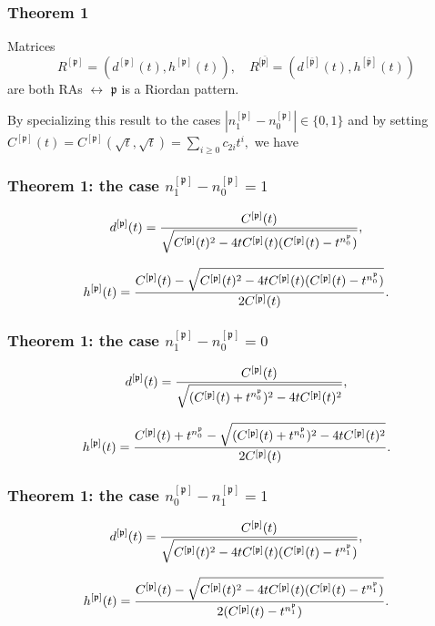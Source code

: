\documentclass{beamer}
\begin{document}
\begin{frame}\frametitle{Theorem 1}
Matrices 
\begin{displaymath}
{{R}^{[\mathfrak{p}]}}=(d^{[\mathfrak{p}]}(t),h^{[\mathfrak{p}]}(t)), \quad
{{R}^{[\bar{\mathfrak{p}]}}}=(d^{[\bar{\mathfrak{p}}]}(t),h^{[\bar{\mathfrak{p}}]}(t))
\end{displaymath}
are both RAs $\leftrightarrow$  $\mathfrak{p}$ is a Riordan pattern.

\begin{block}{}
By specializing this result  to the cases
$\left|n_1^{[\mathfrak{p}]}-n_0^{[\mathfrak{p}]}\right|\in \{0,1\}$ and by
setting
$C^{[\mathfrak{p}]}(t)=C^{[\mathfrak{p}]}\left(\sqrt{t},\sqrt{t}\right)=\sum_{i
\geq 0}c_{2i}t^i,$ we have
\end{block}

\end{frame}

\begin{frame}\frametitle{Theorem 1: the case $n_1^{[\mathfrak{p}]}-n_0^{[\mathfrak{p}]}=1$}
$$d^{[\mathfrak{p}]}(t)={C^{[\mathfrak{p}]}(t)
\over \sqrt{C^{[\mathfrak{p}]}(t)^2-4tC^{[\mathfrak{p}]}(t)(C^{[\mathfrak{p}]}(t)-t^{n_0^{\mathfrak{p}}})}}, $$

$$h^{[\mathfrak{p}]}(t)={C^{[\mathfrak{p}]}(t) -\sqrt{C^{[\mathfrak{p}]}(t)^2-4tC^{[\mathfrak{p}]}(t)(C^{[\mathfrak{p}]}(t)-t^{n_0^{\mathfrak{p}}})}
\over 2 C^{[\mathfrak{p}]}(t)}.$$
\end{frame}

\begin{frame}\frametitle{Theorem 1: the case $n_1^{[\mathfrak{p}]}-n_0^{[\mathfrak{p}]}=0$}
$$d^{[\mathfrak{p}]}(t)={C^{[\mathfrak{p}]}(t)
\over \sqrt{( C^{[\mathfrak{p}]}(t)+t^{n_0^{\mathfrak{p}}})^2-4tC^{[\mathfrak{p}]}(t)^2}}, $$

$$h^{[\mathfrak{p}]}(t)=
{C^{[\mathfrak{p}]}(t)+ t^{n_0^{\mathfrak{p}}} - \sqrt{( C^{[\mathfrak{p}]}(t)+t^{n_0^{\mathfrak{p}}})^2-4tC^{[\mathfrak{p}]}(t)^2} \over 2
C^{[\mathfrak{p}]}(t)}.$$
\end{frame}

\begin{frame}\frametitle{Theorem 1: the case $n_0^{[\mathfrak{p}]}-n_1^{[\mathfrak{p}]}=1$}
$$d^{[\mathfrak{p}]}(t)={C^{[\mathfrak{p}]}(t)
\over \sqrt{C^{[\mathfrak{p}]}(t)^2-4tC^{[\mathfrak{p}]}(t)(C^{[\mathfrak{p}]}(t)-t^{n_1^{\mathfrak{p}}})}}, $$

$$h^{[\mathfrak{p}]}(t)={C^{[\mathfrak{p}]}(t) -\sqrt{C^{[\mathfrak{p}]}(t)^2-4tC^{[\mathfrak{p}]}(t)(C^{[\mathfrak{p}]}(t)-t^{n_1^{\mathfrak{p}}})}
\over 2 (C^{[\mathfrak{p}]}(t)- t^{n_1^{\mathfrak{p}}})}.$$
\end{frame}
\end{document}

